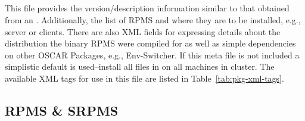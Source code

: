 \subsection{}
This file provides the version/description information similar to that
obtained from an .  Additionally,
the list of RPMS and where they are to be installed, e.g., server or clients.
There are also XML fields for expressing details about the distribution the 
binary RPMS were compiled for as well as simple dependencies on other OSCAR
Packages, e.g., Env-Switcher.  If this meta file is not included a
simplistic default is used--install all files in  on all
machines in cluster.  The available XML tags for use in this file are
listed in Table~\ref{tab:pkg-xml-tags}.




\subsection{RPMS \& SRPMS}


